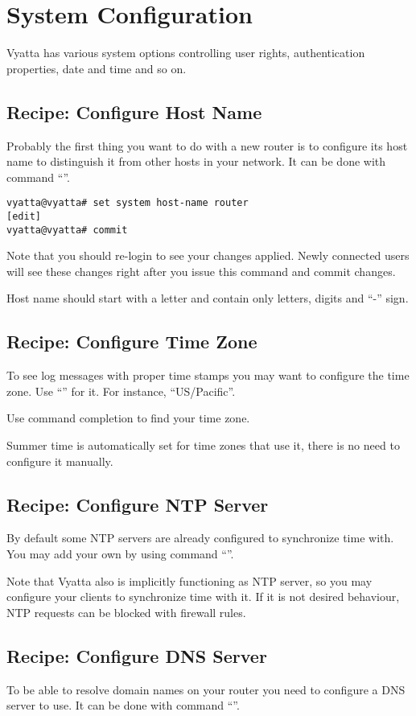 \chapter{System Configuration}
Vyatta has various system options controlling user rights, authentication properties, date and time and so on.

\section{Recipe: Configure Host Name}
Probably the first thing you want to do with a new router is to configure its host name to distinguish it from
other hosts in your network. It can be done with command ``''.
\begin{verbatim}
vyatta@vyatta# set system host-name router 
[edit]
vyatta@vyatta# commit
\end{verbatim}
Note that you should re-login to see your changes applied. Newly connected users will see these changes right after
you issue this command and commit changes.

Host name should start with a letter and contain only letters, digits and ``-'' sign.

\section{Recipe: Configure Time Zone}
To see log messages with proper time stamps you may want to configure the time zone. Use 
``'' for it. For instance, ``US/Pacific''.

Use command completion to find your time zone.

Summer time is automatically set for time zones that use it, there is no need to configure it
manually.

\section{Recipe: Configure NTP Server}
By default some NTP servers are already configured to synchronize time with. You may add your own by using command
``''.

Note that Vyatta also is implicitly functioning as NTP server, so you may configure your clients
to synchronize time with it. If it is not desired behaviour, NTP requests can be blocked with
firewall rules.

\section{Recipe: Configure DNS Server}
To be able to resolve domain names on your router you need to configure a DNS server to use. It can be done
with command ``''.

